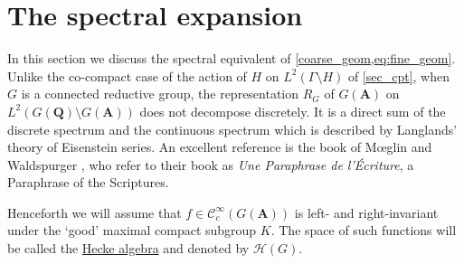 \documentclass[11pt]{amsart}
\def\A{\mathbf A}
\def\Q{\mathbf Q}
\def\CCC{\mathcal C}
\def\HHH{\mathcal H}
\def\bs{\setminus}
\def\Ltwo{L^2}
\theoremstyle{remark}
\begin{document}
\section{The spectral expansion} \label{sec:spec}

In this section we discuss the spectral equivalent of \cref{coarse_geom,eq:fine_geom}. Unlike the co-compact case of the action of $H$ on $\Ltwo(\Gamma \bs H)$ of \cref{sec_cpt}, when $G$ is a connected reductive group, the representation $R_G$ of $G(\A)$ on $\Ltwo(G(\Q)\bs G(\A))$ does not decompose discretely. It is a direct sum of the discrete spectrum and the continuous spectrum which is described by Langlands' theory of Eisenstein series. An excellent reference is the book of M{\oe}glin and Waldspurger \cite{MW}, who refer to their book as \textit{Une Paraphrase de l'\'{E}criture}, a Paraphrase of the Scriptures. 

Henceforth we will assume that $f \in \CCC^\infty_c(G(\A))$ is left- and right-invariant under the `good' maximal compact subgroup $K$. The space of such functions will be called the \underline{Hecke algebra} and denoted by $\HHH(G)$.
\end{document}
